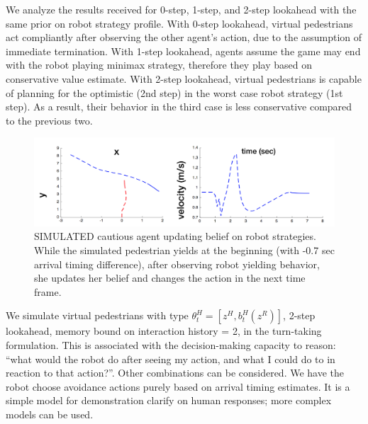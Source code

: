 \documentclass[letterpaper, 10 pt, conference]{ieeeconf}  %
\begin{document}
We analyze the results received for 0-step, 1-step, and 2-step lookahead with the same prior on robot strategy profile. With 0-step lookahead, virtual pedestrians act 
compliantly after observing the other agent's action, due to the assumption of immediate termination. With 1-step lookahead, agents assume the game may end with the robot playing minimax strategy, therefore they play based on conservative value estimate. With 2-step lookahead, virtual pedestrians is capable of planning for the optimistic (2nd step) in the worst case robot strategy (1st step). As a result, their behavior in the third case is less conservative compared to the previous two. 

\begin{figure}[t]
      \centering
      \hspace{-5em}
      \vspace{-1.3em}
      \includegraphics[scale=0.33]{adaptation}
      \hspace{-5em}
      \caption{SIMULATED cautious agent updating belief on robot strategies. While the simulated pedestrian yields at the 
      beginning (with -0.7 sec arrival timing difference), after observing 
      robot yielding behavior, she updates her 
      belief and changes the action in the next time frame.}
      \vspace{-2em}
     \label{fig:adaptation}
\end{figure}

We simulate virtual pedestrians with type $\theta^H_t = [z^H, b^H_t(z^R)]$, 2-step lookahead, memory bound on interaction history = 2, in the turn-taking formulation. This is associated with the decision-making capacity to reason: ``what would the robot do after seeing my action, and what I could do to in reaction to that action?''. Other combinations can be considered. We have the robot choose avoidance actions purely based on arrival timing estimates. It is a simple model for demonstration clarify on human responses; more complex models can be used.
\end{document}
